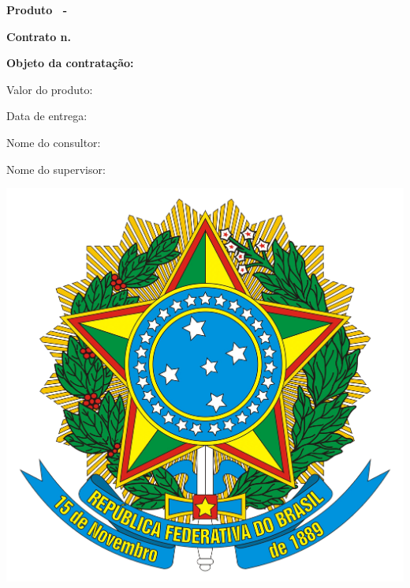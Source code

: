 \addtolength{\topmargin}{2.5cm}
\thispagestyle{empty}
{\color{MidnightBlue}

{\bf \LARGE Produto \ProductNumber\ -\ \ProductTitle}

\hrulefill

\vspace{1cm}

\begin{center}

{\bf \large Contrato n. \ContractNumber}

\vspace{1.5cm}

{\bf \large Objeto da contratação: \ObjetoContratacao}

\end{center}

\vspace{3.2cm}

Valor do produto: \ProductValue

\vspace{1.2cm}

Data de entrega: \DataEntrega

\vspace{1.2cm}

Nome do consultor: \MyName

\vspace{1.2cm}

Nome do supervisor: \SupervisorName

}

\vspace{2cm}

\begin{center}
\includegraphics[scale=0.04]{brasao.png} \\
{\bf \small \NomeSecretaria}
\end{center}

\restoregeometry
\newpage
